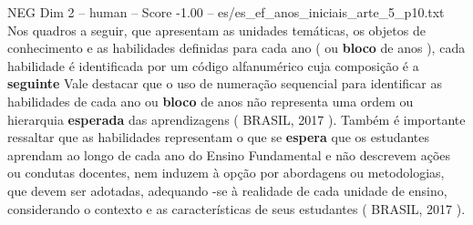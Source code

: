 \begin{textsample}{NEG Dim 2 – human – Score -1.00 – es/es\_ef\_anos\_iniciais\_arte\_5\_p10.txt}  \label{ex:f2_neg_003}
Nos quadros a seguir, que apresentam as unidades temáticas, os objetos de conhecimento e as habilidades definidas para cada ano ( ou \textbf{bloco} de anos ), cada habilidade é identificada por um código alfanumérico cuja composição é a \textbf{seguinte} Vale destacar que o uso de numeração sequencial para identificar as habilidades de cada ano ou \textbf{bloco} de anos não representa uma ordem ou hierarquia \textbf{esperada} das aprendizagens ( BRASIL, 2017 ).
Também é importante ressaltar que as habilidades representam o que se \textbf{espera} que os estudantes aprendam ao longo de cada ano do Ensino Fundamental e não descrevem ações ou condutas docentes, nem induzem à opção por abordagens ou metodologias, que devem ser adotadas, adequando -se à realidade de cada unidade de ensino, considerando o contexto e as características de seus estudantes ( BRASIL, 2017 ).

\end{textsample}

